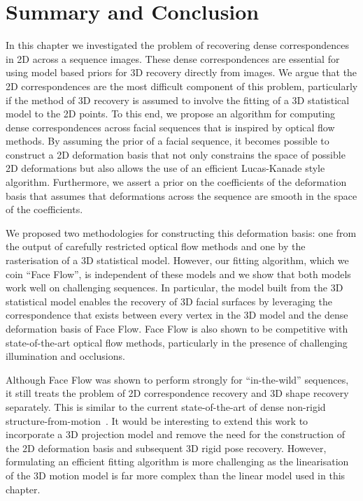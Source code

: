 \section{Summary and Conclusion}\label{sec:face_flow_conclusion}
In this chapter we investigated the problem of recovering dense correspondences
in 2D across a sequence images. These dense correspondences are essential
for using model based priors for 3D recovery directly from images. We argue that
the 2D correspondences are the most difficult component of this problem,
particularly if the method of 3D recovery is assumed to involve the fitting
of a 3D statistical model to the 2D points. To this end, we propose an algorithm
for computing dense correspondences across facial sequences that is inspired by
optical flow methods. By assuming the prior of a facial sequence, it becomes
possible to construct a 2D deformation basis that not only constrains the space
of possible 2D deformations but also allows the use of an efficient Lucas-Kanade
style algorithm. Furthermore, we assert a prior on the coefficients
of the deformation basis that assumes that deformations across the sequence
are smooth in the space of the coefficients.

We proposed two methodologies for constructing this deformation basis: one
from the output of carefully restricted optical flow methods and one by
the rasterisation of a 3D statistical model. However, our fitting algorithm,
which we coin ``Face Flow'', is independent of these models and we show that
both models work well on challenging sequences. In particular, the model built
from the 3D statistical model enables the recovery of 3D facial surfaces by
leveraging the correspondence that exists between every vertex in the 3D model
and the dense deformation basis of Face Flow. Face Flow is also shown to be
competitive with state-of-the-art optical flow methods, particularly in
the presence of challenging illumination and occlusions.

Although Face Flow was shown to perform strongly for ``in-the-wild'' sequences,
it still treats the problem of 2D correspondence recovery and 3D shape recovery
separately.  This is similar to the current state-of-the-art of dense non-rigid
structure-from-motion~\cite{garg2013dense}. It would be interesting to
extend this work to incorporate a 3D projection model and remove the need
for the construction of the 2D deformation basis and subsequent 3D rigid pose
recovery. However, formulating an efficient fitting algorithm is more challenging
as the linearisation of the 3D motion model is far more complex than the linear
model used in this chapter.
